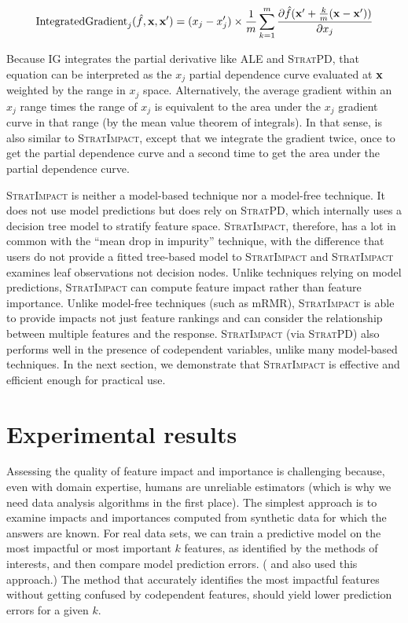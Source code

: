 \documentclass[11pt]{article}
\newcommand{\simp}{\fontfamily{cmr}\textsc{\small StratImpact}}
\newcommand{\spd}{\fontfamily{cmr}\textsc{\small StratPD}}
\begin{document}
\begin{equation}
\text{IntegratedGradient}_j(\hat{f}, {\bf x},{\bf x'}) = (x_j - x'_j) \times \frac{1}{m} \sum_{k=1}^{m} \frac{\partial \hat{f}({\bf x}' + \frac{k}{m}({\bf x}-{\bf x}'))}{\partial x_j}
\end{equation}

\noindent  Because IG integrates the partial derivative like ALE and \spd, that equation can be interpreted as the $x_j$ partial dependence curve evaluated at $\bf x$ weighted by the range in $x_j$ space. Alternatively, the average gradient within an $x_j$ range times the range of $x_j$ is equivalent to the area under the $x_j$ gradient curve in that range (by the mean value theorem of integrals). In that sense, \cite{intgrad} is also similar to \simp, except that we integrate the gradient twice, once to get the partial dependence curve and a second time to get the area under the partial dependence curve.

\simp{} is neither a model-based technique nor a model-free technique. It does not use model predictions but does rely on \spd, which internally uses a decision tree model to stratify feature space. \simp{}, therefore, has a lot in common with the ``mean drop in impurity'' technique, with the difference that users do not provide a fitted tree-based model to \simp{} and \simp{} examines leaf observations not decision nodes. Unlike techniques relying on model predictions, \simp{} can compute feature impact rather than feature importance. Unlike model-free techniques (such as mRMR), \simp{} is able to provide impacts not just feature rankings and can consider the relationship between multiple features and the response.   \simp{} (via \spd) also performs well in the presence of codependent variables, unlike many model-based techniques. In the next section, we demonstrate that \simp{} is effective and efficient enough for practical use.

\section{Experimental results}\label{sec:experiments}

Assessing the quality of feature impact and importance is challenging because, even with domain expertise, humans are unreliable estimators (which is why we need data analysis algorithms in the first place).  The simplest approach is to examine impacts and importances computed from synthetic data for which the answers are known.  For real data sets, we can train a predictive model on the most impactful or most important $k$ features, as identified by the methods of interests, and then compare model prediction errors. (\citealt{mRMR} and \citealt{tsanas} also used this approach.) The method that accurately identifies the most impactful features without getting confused by codependent features, should yield lower prediction errors for a given $k$.  
\end{document}
